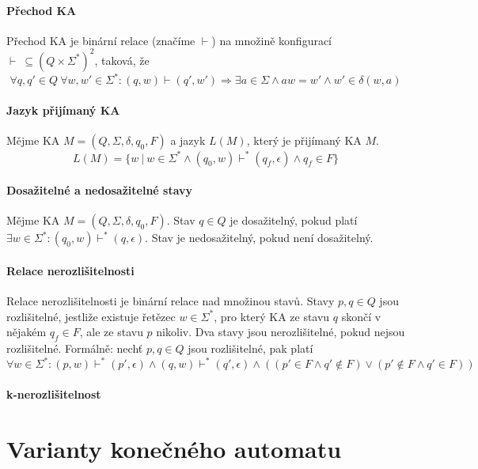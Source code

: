\paragraph*{Přechod KA} Přechod KA je binární relace (značíme $\vdash$) na množině konfigurací $\vdash ~ \subseteq (Q \times \Sigma^*)^2$, taková, že $$ \forall q, q' \in Q ~ \forall w, w' \in \Sigma^* : (q, w) \vdash (q', w') \Rightarrow  \exists a \in \Sigma \land aw = w' \land w' \in \delta(w, a)$$

\paragraph*{Jazyk přijímaný KA} Mějme KA $M = (Q, \Sigma, \delta, q_0, F)$ a jazyk $L(M)$, který je přijímaný KA $M$. $$ L(M) = \{ w ~|~ w \in \Sigma^* \land (q_0, w) \vdash^* (q_f, \epsilon) \land q_f \in F \}$$

\paragraph*{Dosažitelné a nedosažitelné stavy} Mějme KA $M = (Q, \Sigma, \delta, q_0, F)$. Stav $q \in Q$ je dosažitelný, pokud platí $\exists w \in \Sigma^* : (q_0, w) \vdash^* (q, \epsilon)$. Stav je nedosažitelný, pokud není dosažitelný.

\paragraph*{Relace nerozlišitelnosti} Relace nerozlišitelnosti je binární relace nad množinou stavů. Stavy $p, q \in Q$ jsou rozlišitelné, jestliže existuje řetězec $w \in \Sigma^*$, pro který KA ze stavu $q$ skončí v nějakém $q_f \in F$, ale ze stavu $p$ nikoliv. Dva stavy jsou nerozlišitelné, pokud nejsou rozlišitelné. Formálně: nechť $p, q \in Q$ jsou rozlišitelné, pak platí $$ \forall w \in \Sigma^* : (p, w) \vdash^* (p', \epsilon) \land (q, w) \vdash^* (q', \epsilon) \land ( (p' \in F \land q' \not\in F) \lor (p' \not\in F \land q' \in F) ) $$

\paragraph*{k-nerozlišitelnost} 


\section{Varianty konečného automatu}

